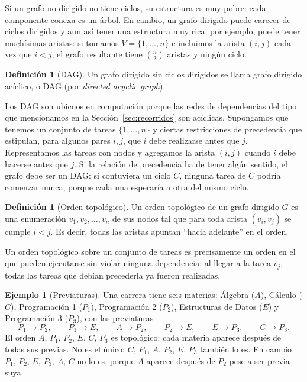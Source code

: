 \documentclass[12pt, spanish, oneside, openany]{book}
\theoremstyle{uprightplain}
\theoremstyle{definition}
\newtheorem{definicion}[teorema]{Definición}
\newtheorem{ejemplo}[teorema]{Ejemplo}
\theoremstyle{remark}
\theoremstyle{definition}
\begin{document}
Si un grafo no dirigido no tiene ciclos, su estructura es muy pobre: cada componente conexa es un árbol. En cambio, un grafo dirigido puede carecer de ciclos dirigidos y aun así tener una estructura muy rica; por ejemplo, puede tener muchísimas aristas: si tomamos $V=\{1,\dots,n\}$ e incluimos la arista $(i,j)$ cada vez que $i<j$, el grafo resultante tiene $\binom{n}{2}$ aristas y ningún ciclo.

\begin{definicion}[DAG]
\label{def:dag}
Un grafo dirigido sin ciclos dirigidos se llama grafo dirigido acíclico, o DAG (por \emph{directed acyclic graph}).
\end{definicion}

Los DAG son ubicuos en computación porque las redes de dependencias del tipo que mencionamos en la Sección~\ref{sec:recorridos} son acíclicas. Supongamos que tenemos un conjunto de tareas $\{1,\dots,n\}$ y ciertas restricciones de precedencia que estipulan, para algunos pares $i,j$, que $i$ debe realizarse antes que $j$. Representamos las tareas con nodos y agregamos la arista $(i,j)$ cuando $i$ debe hacerse antes que $j$. Si la relación de precedencia ha de tener algún sentido, el grafo debe ser un DAG: si contuviera un ciclo $C$, ninguna tarea de $C$ podría comenzar nunca, porque cada una esperaría a otra del mismo ciclo.

\begin{definicion}[Orden topológico]
\label{def:orden-topologico}
Un orden topológico de un grafo dirigido $G$ es una enumeración $v_1,v_2,\dots,v_n$ de sus nodos tal que para toda arista $(v_i,v_j)$ se cumple $i<j$. Es decir, todas las aristas apuntan ``hacia adelante'' en el orden.
\end{definicion}

Un orden topológico sobre un conjunto de tareas es precisamente un orden en el que pueden ejecutarse sin violar ninguna dependencia: al llegar a la tarea $v_j$, todas las tareas que debían precederla ya fueron realizadas.

\begin{ejemplo}[Previaturas]
\label{ej:previaturas}
Una carrera tiene seis materias: Álgebra ($A$), Cálculo ($C$), Programación 1 ($P_1$), Programación 2 ($P_2$), Estructuras de Datos ($E$) y Programación 3 ($P_3$), con las previaturas
\[
P_1\to P_2,\qquad P_1\to E,\qquad A\to P_2,\qquad P_2\to E,\qquad E\to P_3,\qquad C\to P_3 .
\]
El orden $A,\,P_1,\,P_2,\,E,\,C,\,P_3$ es topológico: cada materia aparece después de todas sus previas. No es el único: $C,\,P_1,\,A,\,P_2,\,E,\,P_3$ también lo es. En cambio $P_1,\,P_2,\,E,\,P_3,\,A,\,C$ no lo es, porque $A$ aparece después de $P_2$ pese a ser previa suya.
\end{ejemplo}
\end{document}
